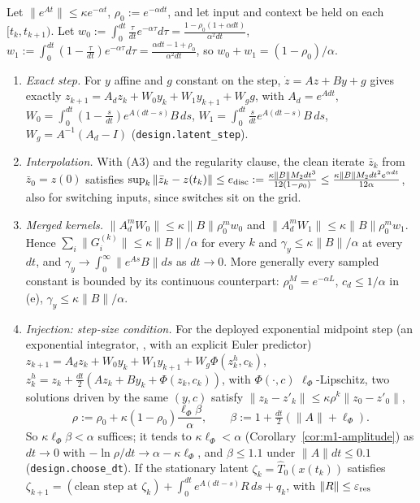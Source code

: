 \begin{lemma}[Lemma D]\label{lem:D}
Let $\|e^{At}\|\le\kappa e^{-\alpha t}$, $\rho_0:=e^{-\alpha dt}$, and let input and context be held on
each $[t_k,t_{k+1})$. Let
$w_0:=\int_0^{dt}\tfrac{\tau}{dt}e^{-\alpha\tau}d\tau=\frac{1-\rho_0(1+\alpha dt)}{\alpha^2dt}$,
$w_1:=\int_0^{dt}(1-\tfrac\tau{dt})e^{-\alpha\tau}d\tau=\frac{\alpha dt-1+\rho_0}{\alpha^2dt}$, so
$w_0+w_1=(1-\rho_0)/\alpha$.
\begin{enumerate}[label=(\alph*)]
\item \emph{Exact step.} For $y$ affine and $g$ constant on the step, $\dot z=Az+By+g$ gives exactly
$z_{k+1}=A_dz_k+W_0y_k+W_1y_{k+1}+W_gg$, with $A_d=e^{Adt}$,
$W_0=\int_0^{dt}(1-\tfrac s{dt})e^{A(dt-s)}B\,ds$, $W_1=\int_0^{dt}\tfrac s{dt}e^{A(dt-s)}B\,ds$,
$W_g=A^{-1}(A_d-I)$ (\texttt{design.latent\_step}).
\item \emph{Interpolation.} With (A3) and the regularity clause, the clean iterate $\bar z_k$ from
$\bar z_0=z(0)$ satisfies
$\sup_k\|\bar z_k-z(t_k)\|\le e_{\rm disc}:=\frac{\kappa\|B\|M_2dt^3}{12(1-\rho_0)}\le\frac{\kappa\|B\|M_2dt^2e^{\alpha dt}}{12\alpha}$,
also for switching inputs, since switches sit on the grid.
\item \emph{Merged kernels.} $\|A_d^mW_0\|\le\kappa\|B\|\rho_0^mw_0$ and $\|A_d^mW_1\|\le\kappa\|B\|\rho_0^mw_1$. Hence
$\sum_i\|G^{(k)}_i\|\le\kappa\|B\|/\alpha$ for every $k$ and $\gamma_y\le\kappa\|B\|/\alpha$ at every $dt$, and
$\gamma_y\to\int_0^\infty\|e^{As}B\|ds$ as $dt\to0$. More generally every sampled constant is bounded by its
continuous counterpart: $\rho_0^M=e^{-\alpha L}$, $c_d\le1/\alpha$ in (e), $\gamma_y\le\kappa\|B\|/\alpha$.
\item \emph{Injection: step-size condition.} For the deployed exponential midpoint step (an
exponential integrator, \citealp{hochbruck2010exponential}, with an explicit Euler predictor)
$z_{k+1}=A_dz_k+W_0y_k+W_1y_{k+1}+W_g\Phi(z^h_k,c_k)$, $z^h_k=z_k+\tfrac{dt}2(Az_k+By_k+\Phi(z_k,c_k))$,
with $\Phi(\cdot,c)$ $\ell_\Phi$-Lipschitz, two solutions driven by the same $(y,c)$ satisfy
$\|z_k-z'_k\|\le\kappa\rho^k\|z_0-z'_0\|$,
\[
\rho:=\rho_0+\kappa(1-\rho_0)\frac{\ell_\Phi\beta}{\alpha},\qquad\beta:=1+\tfrac{dt}2(\|A\|+\ell_\Phi).
\]
So $\kappa\ell_\Phi\beta<\alpha$ suffices; it tends to $\kappa\ell_\Phi<\alpha$
(Corollary~\ref{cor:m1-amplitude}) as $dt\to0$ with $-\ln\rho/dt\to\alpha-\kappa\ell_\Phi$, and $\beta\le1.1$
under $\|A\|dt\le0.1$ (\texttt{design.choose\_dt}). If the stationary latent $\zeta_k=\hat T_0(x(t_k))$ satisfies
$\zeta_{k+1}=(\text{clean step at }\zeta_k)+\int_0^{dt}e^{A(dt-s)}R\,ds+q_k$, with $\|R\|\le\varepsilon_{\rm res}$

\end{enumerate}
\end{lemma}
